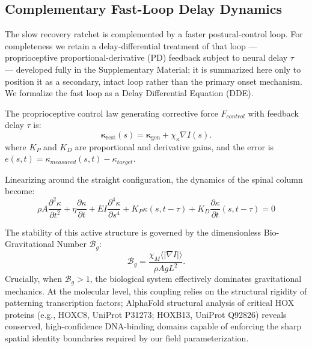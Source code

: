 \subsection{Complementary Fast-Loop Delay Dynamics}

The slow recovery ratchet is complemented by a faster postural-control loop. For completeness we retain a delay-differential treatment of that loop --- proprioceptive proportional-derivative (PD) feedback subject to neural delay $\tau$~\cite{milton2009time, insperger2013acceleration} --- developed fully in the Supplementary Material; it is summarized here only to position it as a secondary, intact loop rather than the primary onset mechanism. We formalize the fast loop as a Delay Differential Equation (DDE).

The proprioceptive control law generating corrective force $F_{control}$ with feedback delay $\tau$ is:
\begin{equation}
\boldsymbol{\kappa}_{\mathrm{rest}}(s) = \boldsymbol{\kappa}_{\mathrm{gen}} + \chi_\kappa \nabla I(s).
\label{eq:kappa_rest_field}
\end{equation}
where $K_P$ and $K_D$ are proportional and derivative gains, and the error is $e(s,t) = \kappa_{measured}(s,t) - \kappa_{target}$.

Linearizing around the straight configuration, the dynamics of the spinal column become:
\begin{equation}
\rho A \frac{\partial^2 \kappa}{\partial t^2} + \eta \frac{\partial \kappa}{\partial t} + EI \frac{\partial^4 \kappa}{\partial s^4} + K_P \kappa(s, t-\tau) + K_D \frac{\partial \kappa}{\partial t}(s, t-\tau) = 0
\label{eq:dde_spine}
\end{equation}

The stability of this active structure is governed by the dimensionless Bio-Gravitational Number $\mathcal{B}_g$:
\begin{equation}
\mathcal{B}_g = \frac{\chi_M \langle |\nabla I| \rangle}{\rho A g L^2}.
\label{eq:bg_number_info}
\end{equation}
Crucially, when $\mathcal{B}_g > 1$, the biological system effectively dominates gravitational mechanics. At the molecular level, this coupling relies on the structural rigidity of patterning transcription factors; AlphaFold structural analysis of critical HOX proteins (e.g., HOXC8, UniProt P31273; HOXB13, UniProt Q92826) reveals conserved, high-confidence DNA-binding domains capable of enforcing the sharp spatial identity boundaries required by our field parameterization.

